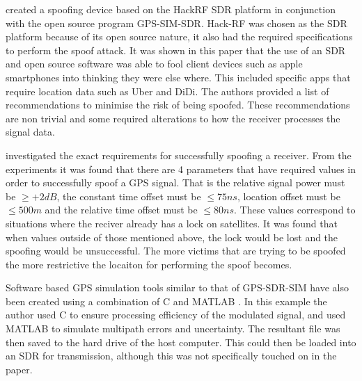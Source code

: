 \textcite{RN28} created a spoofing device based on the HackRF SDR platform in conjunction with the open source program GPS-SIM-SDR. Hack-RF was chosen as the SDR platform
because of its open source nature, it also had the required specifications to perform the spoof attack. It was shown in this paper that the use of an SDR and open source
software was able to fool client devices such as apple smartphones into thinking they were else where. This included specific apps that require location data such as Uber
and DiDi. The authors provided a list of recommendations to minimise the risk of being spoofed. These recommendations are non trivial and some required alterations to how
the receiver processes the signal data.

\textcite{RN30} investigated the exact requirements for successfully spoofing a receiver. From the experiments it was found that there are 4 parameters that have required
values in order to successfully spoof a GPS signal. That is the relative signal power must be $\geq+2dB$, the constant time offset must be $\leq 75ns$, location offset
must be $\leq 500m$ and the relative time offset must be $\leq 80ns$. These values correspond to situations where the reciver already has a lock on satellites. It was
found that when values outside of those mentioned above, the lock would be lost and the spoofing would be unsuccessful. The more victims that are trying to be spoofed the
more restrictive the locaiton for performing the spoof becomes.

Software based GPS simulation tools similar to that of GPS-SDR-SIM have also been created using a combination of C and MATLAB \cite{RN15}. In this example the author used
C to ensure processing efficiency of the modulated signal, and used MATLAB to simulate multipath errors and uncertainty. The resultant file was then saved to the hard
drive of the host computer. This could then be loaded into an SDR for transmission, although this was not specifically touched on in the paper.

